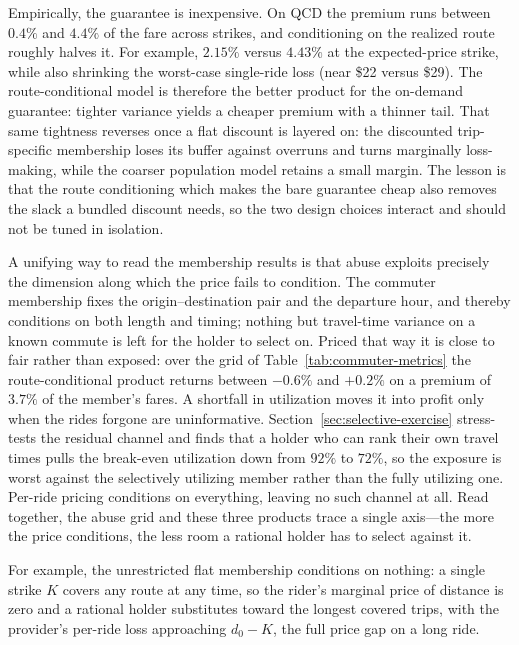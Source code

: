 \documentclass[12pt]{article}
\begin{document}
{{{{{{{{Empirically, the guarantee is inexpensive. On QCD the premium runs between
$0.4\%$ and $4.4\%$ of the fare across strikes, and conditioning on the realized
route roughly halves it. For example, $2.15\%$ versus $4.43\%$ at the
expected-price strike, while also shrinking the worst-case single-ride loss
(near \$22 versus \$29). The route-conditional model is therefore the better
product for the on-demand guarantee: tighter variance yields a cheaper premium
with a thinner tail. That same tightness reverses once a flat discount is
layered on: the discounted trip-specific membership loses its buffer against
overruns and turns marginally loss-making, while the coarser population model
retains a small margin. The lesson is that the route conditioning which makes
the bare guarantee cheap also removes the slack a bundled discount needs, so the
two design choices interact and should not be tuned in isolation.
 
A unifying way to read the membership results is that abuse exploits precisely
the dimension along which the price fails to condition. The commuter
membership fixes the origin--destination pair and the departure hour, and thereby
conditions on both length and timing; nothing but travel-time variance on a known
commute is left for the holder to select on. Priced that way it is close to fair
rather than exposed: over the grid of Table~\ref{tab:commuter-metrics} the
route-conditional product returns between $-0.6\%$ and $+0.2\%$ on a premium of
$3.7\%$ of the member's fares. A shortfall in utilization moves it into profit
only when the rides forgone are uninformative. Section~\ref{sec:selective-exercise} stress-tests the residual channel and finds
that a holder who can rank their own travel times pulls the break-even
utilization down from $92\%$ to $72\%$, so the exposure is worst against the
selectively utilizing member rather than the fully utilizing one. Per-ride pricing conditions on everything, leaving no such channel at all. Read together, the abuse grid and these three products trace a single axis---the
more the price conditions, the less room a rational holder has to select against it.

For example, the unrestricted flat membership conditions on nothing: a single strike $K$ covers any route at any
time, so the rider's marginal price of distance is zero and a rational holder
substitutes toward the longest covered trips, with the provider's per-ride loss
approaching $d_0 - K$, the full price gap on a long ride.
 
}}}}}}}}
\end{document}
